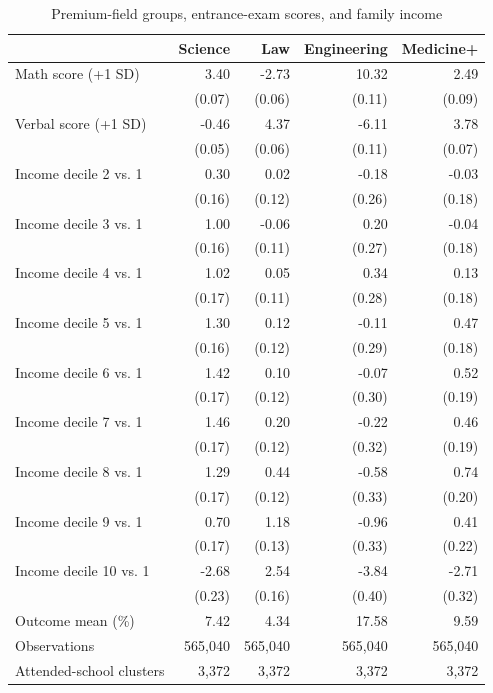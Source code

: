 \begin{table}[!htbp]\centering
\caption{Premium-field groups, entrance-exam scores, and family income}
\label{tab:premium-field-groups-scores-income}
\small
\begin{tabular}{lrrrr}\hline\hline
 & Science & Law & Engineering & Medicine+ \\ \hline
Math score (+1 SD) & 3.40 & -2.73 & 10.32 & 2.49 \\
 & (0.07) & (0.06) & (0.11) & (0.09) \\
Verbal score (+1 SD) & -0.46 & 4.37 & -6.11 & 3.78 \\
 & (0.05) & (0.06) & (0.11) & (0.07) \\
Income decile 2 vs. 1 & 0.30 & 0.02 & -0.18 & -0.03 \\
 & (0.16) & (0.12) & (0.26) & (0.18) \\
Income decile 3 vs. 1 & 1.00 & -0.06 & 0.20 & -0.04 \\
 & (0.16) & (0.11) & (0.27) & (0.18) \\
Income decile 4 vs. 1 & 1.02 & 0.05 & 0.34 & 0.13 \\
 & (0.17) & (0.11) & (0.28) & (0.18) \\
Income decile 5 vs. 1 & 1.30 & 0.12 & -0.11 & 0.47 \\
 & (0.16) & (0.12) & (0.29) & (0.18) \\
Income decile 6 vs. 1 & 1.42 & 0.10 & -0.07 & 0.52 \\
 & (0.17) & (0.12) & (0.30) & (0.19) \\
Income decile 7 vs. 1 & 1.46 & 0.20 & -0.22 & 0.46 \\
 & (0.17) & (0.12) & (0.32) & (0.19) \\
Income decile 8 vs. 1 & 1.29 & 0.44 & -0.58 & 0.74 \\
 & (0.17) & (0.12) & (0.33) & (0.20) \\
Income decile 9 vs. 1 & 0.70 & 1.18 & -0.96 & 0.41 \\
 & (0.17) & (0.13) & (0.33) & (0.22) \\
Income decile 10 vs. 1 & -2.68 & 2.54 & -3.84 & -2.71 \\
 & (0.23) & (0.16) & (0.40) & (0.32) \\
\hline
Outcome mean (\%) & 7.42 & 4.34 & 17.58 & 9.59 \\
Observations & 565,040 & 565,040 & 565,040 & 565,040 \\
Attended-school clusters & 3,372 & 3,372 & 3,372 & 3,372 \\

\end{tabular}
\end{table}
